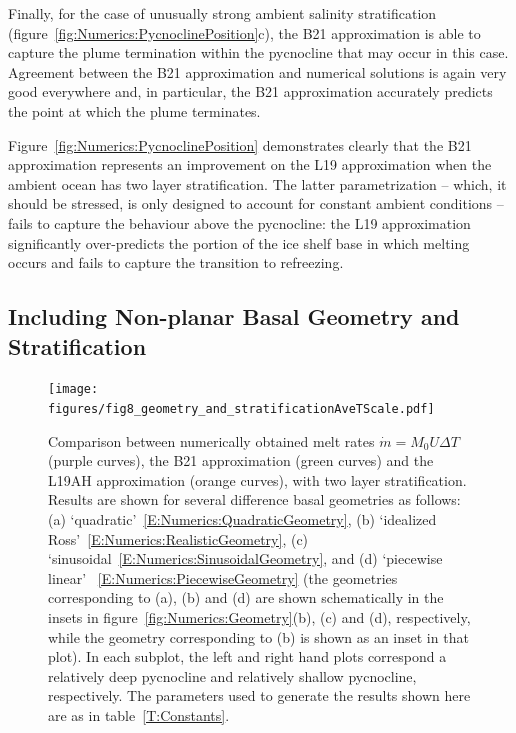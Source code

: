 \documentclass[openacc]{rsproca_new}%
\begin{document}
Finally, for the case of unusually strong ambient salinity stratification (figure~\ref{fig:Numerics:PycnoclinePosition}c), the B21 approximation is able to capture the plume termination within the pycnocline that may occur in this case. Agreement between the B21 approximation and numerical solutions is again very good everywhere and, in particular, the B21 approximation accurately predicts the point at which the plume terminates.

Figure~\ref{fig:Numerics:PycnoclinePosition} demonstrates clearly that the B21 approximation represents an improvement on the L19 approximation when the ambient ocean has two layer stratification. The latter parametrization -- which, it should be stressed, is only designed to account for constant ambient conditions -- fails to capture the behaviour above the pycnocline: the L19 approximation significantly over-predicts the portion of the ice shelf base in which melting occurs and fails to capture the transition to refreezing.

\subsection{Including Non-planar Basal Geometry and Stratification}
\begin{figure}
\centering
\texttt{[image: figures/fig8\_geometry\_and\_stratificationAveTScale.pdf]}
\caption{Comparison between numerically obtained melt rates $\dot{m}= M_0 U \Delta T$ (purple curves), the B21 approximation (green curves) and the L19AH approximation (orange curves), with two layer stratification. Results are shown for several difference basal geometries as follows: (a) `quadratic'~\eqref{E:Numerics:QuadraticGeometry}, (b) `idealized Ross'~\eqref{E:Numerics:RealisticGeometry}, (c) `sinusoidal~\eqref{E:Numerics:SinusoidalGeometry}, and (d) `piecewise linear' ~\eqref{E:Numerics:PiecewiseGeometry} (the geometries corresponding to (a), (b) and (d) are shown schematically in the insets in figure~\ref{fig:Numerics:Geometry}(b), (c) and (d), respectively, while the geometry corresponding to (b) is shown as an inset in that plot). In each subplot, the left and right hand plots correspond a relatively deep pycnocline and relatively shallow pycnocline, respectively.  The parameters used to generate the results shown here are as in table~\ref{T:Constants}. }\label{fig:Numerics:pycnocline_and_geometry_idealized}
\end{figure}
\end{document}
